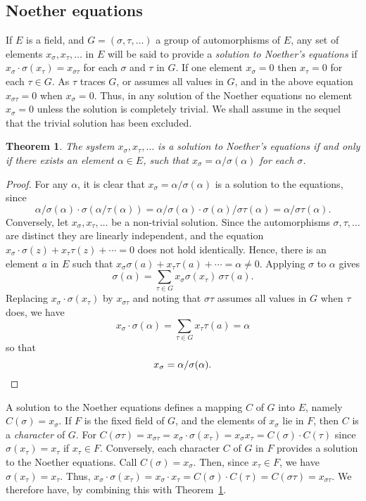 \documentclass[10pt,leqno]{article}
\newtheorem{theo}{Theorem}
\theoremstyle{definition}
\begin{document}
\subsection{Noether equations}

If $E$ is a field, and $G = (\sigma, \tau, \ldots)$ a group of automorphisms of $E$, any set of elements $x_\sigma, x_\tau, \ldots$ in $E$ will be said to provide a \emph{solution to Noether's equations} if $x_\sigma \cdot \sigma(x_\tau) = x_{\sigma\tau}$ for each $\sigma$ and $\tau$ in $G$.
If one element $x_\sigma = 0$ then $x_\tau = 0$ for each $\tau \in G$.
As $\tau$ traces $G$, or assumes all values in $G$, and in the above equation $x_{\sigma\tau} = 0$ when $x_\sigma = 0$.
Thus, in any solution of the Noether equations no element $x_\sigma = 0$ unless the solution is completely trivial.
We shall assume in the sequel that the trivial solution has been excluded.


\begin{theo}
\label{theo:21}
The system $x_\sigma, x_\tau, \ldots$ is a solution to Noether's equations if and only if there exists an element $\alpha \in E$, such that $x_\sigma = \alpha / \sigma(\alpha)$ for each $\sigma$.
\end{theo}


\begin{proof}
For any $\alpha$, it is clear that $x_\sigma = \alpha / \sigma(\alpha)$ is a solution to the equations, since
\[
\alpha / \sigma(\alpha) \cdot \sigma(\alpha / \tau(\alpha))
= \alpha / \sigma(\alpha) \cdot \sigma(\alpha) / \sigma\tau(\alpha)
= \alpha / \sigma\tau(\alpha).
\]
Conversely, let $x_\sigma, x_\tau, \ldots$ be a non-trivial solution.
Since the automorphisms $\sigma, \tau, \ldots$ are distinct they are linearly independent, and the equation $x_\sigma \cdot \sigma(z) + x_\tau\tau(z) + \cdots = 0$ does not hold identically.
Hence, there is an element $a$ in $E$ such that $x_\sigma \sigma(a) + x_\tau \tau(a) + \cdots = \alpha \not= 0$.
Applying $\sigma$ to $\alpha$ gives
\[
\sigma(\alpha)
= \sum_{\tau \in G} x_\sigma \sigma(x_\tau) \, \sigma\tau(a).
\]
Replacing $x_\sigma \cdot \sigma(x_\tau)$ by $x_{\sigma\tau}$ and noting that $\sigma\tau$ assumes all values in $G$ when $\tau$ does, we have
\[
x_\sigma \cdot \sigma(\alpha)
= \sum_{\tau \in G} x_{\tau} \tau(a) 
= \alpha
\]
so that
\[
x_\sigma = \alpha / \sigma(\alpha).
\qedhere
\]
\end{proof}


A solution to the Noether equations defines a mapping $C$ of $G$ into $E$, namely $C(\sigma) = x_\sigma$.
If $F$ is the fixed field of $G$, and the elements of $x_\sigma$ lie in $F$, then $C$ is a \emph{character} of $G$.
For $C(\sigma\tau) = x_{\sigma\tau} = x_\sigma \cdot \sigma(x_\tau) = x_\sigma x_\tau = C(\sigma) \cdot C(\tau)$ since $\sigma(x_\tau) = x_\tau$ if $x_\tau \in F$.
Conversely, each character $C$ of $G$ in $F$ provides a solution to the Noether equations.
Call $C(\sigma) = x_\sigma$.
Then, since $x_\tau \in F$, we have $\sigma(x_\tau) = x_\tau$.
Thus, $x_\sigma \cdot \sigma(x_\tau) = x_\sigma \cdot x_\tau = C(\sigma) \cdot C(\tau) = C(\sigma\tau) = x_{\sigma\tau}$.
We therefore have, by combining this with Theorem~\ref{theo:21}.
\end{document}
